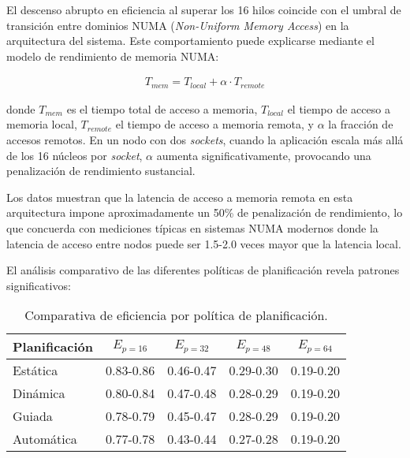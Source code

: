         El descenso abrupto en eficiencia al superar los 16 hilos coincide con el umbral de transición entre dominios NUMA (\textit{Non-Uniform Memory Access}) en la arquitectura del sistema. Este comportamiento puede explicarse mediante el modelo de rendimiento de memoria NUMA:
        
        \begin{align}
            T_{mem} = T_{local} + \alpha \cdot T_{remote}
        \end{align}

        donde $T_{mem}$ es el tiempo total de acceso a memoria, $T_{local}$ el tiempo de acceso a memoria local, $T_{remote}$ el tiempo de acceso a memoria remota, y $\alpha$ la fracción de accesos remotos. En un nodo con dos \textit{sockets}, cuando la aplicación escala más allá de los 16 núcleos por \textit{socket}, $\alpha$ aumenta significativamente, provocando una penalización de rendimiento sustancial.
        
        Los datos muestran que la latencia de acceso a memoria remota en esta arquitectura impone aproximadamente un 50\% de penalización de rendimiento, lo que concuerda con mediciones típicas en sistemas NUMA modernos donde la latencia de acceso entre nodos puede ser 1.5-2.0 veces mayor que la latencia local.
        
        El análisis comparativo de las diferentes políticas de planificación revela patrones significativos:
        
        \begin{table}[H]
            \centering
            \begin{tabular}{|l|c|c|c|c|}
                \hline
                \textbf{Planificación} & \textbf{$E_{p=16}$} & \textbf{$E_{p=32}$} & \textbf{$E_{p=48}$} & \textbf{$E_{p=64}$} \\
                \hline
                Estática & 0.83-0.86 & 0.46-0.47 & 0.29-0.30 & 0.19-0.20 \\
                Dinámica & 0.80-0.84 & 0.47-0.48 & 0.28-0.29 & 0.19-0.20 \\
                Guiada & 0.78-0.79 & 0.45-0.47 & 0.28-0.29 & 0.19-0.20 \\
                Automática & 0.77-0.78 & 0.43-0.44 & 0.27-0.28 & 0.19-0.20 \\
                \hline
            \end{tabular}
            \caption{Comparativa de eficiencia por política de planificación.}
            \label{tab:scheduling_comparison}
        \end{table}

